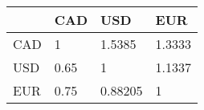 \begin{tabular}{llll}
& CAD & USD & EUR \\ 
\hline 
CAD & 1 & 1.5385 & 1.3333 \\ 
USD & 0.65 & 1 & 1.1337 \\ 
EUR & 0.75 & 0.88205 & 1 \\ 
\hline 
\end{tabular}